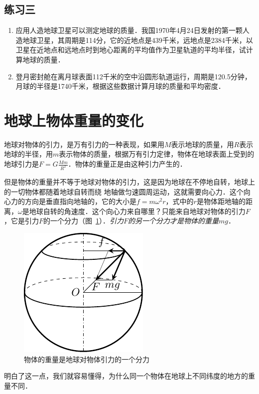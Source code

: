 \subsection*{练习三}
\begin{enumerate}
	\item 应用人造地球卫星可以测定地球的质量．我国1970年4月24日发射的第一颗人造地球卫星，其周期是114分，它的近地点是439千米，远地点是2384千米，以卫星在近地点和远地点时到地心距离的平均值作为卫星轨道的平均半径，试计算地球的质量．
	\item 登月密封舱在离月球表面112千米的空中沿圆形轨道运行，周期是120.5分钟，月球的半径是1740千米，根据这些数据计算月球的质量和平均密度．
\end{enumerate}


\section{地球上物体重量的变化}
地球对物体的引力，是万有引力的一种表现，如果用$M$表示地球的质量，用$R$表示地球的半径，用$m$表示物体的质量，根据万有引力定律，物体在地球表面上受到的地球引力是$F=G\frac{Mm}{R^2}$．物体的重量正是由这种引力产生的．

但是物体的重量并不等于地球对物体的引力，这是因为地球在不停地自转，地球上的一切物体都随着地球自转而绕
地轴做匀速圆周运动，这就需要向心力．这个向心力的方向是垂直指向地轴的，它的大小是$f=m\omega^2r$，式中的$r$是物体距地轴的距离，$\omega$是地球自转的角速度．这个向心力来自哪里？只能来自地球对物体的引力$F$，它是引力$F$的一个分力（图~\ref{fig_A_5-4}）．\textit{引力$F$的另一个分力才是物体的重量$mg$}．
\begin{figure}[htbp]
	\centering
	\includegraphics{fig/A/5-4.pdf}
	\caption{物体的重量是地球对物体引力的一个分力}\label{fig_A_5-4}
\end{figure}

明白了这一点，我们就容易懂得，为什么同一个物体在地球上不同纬度的地方的重量不同．

